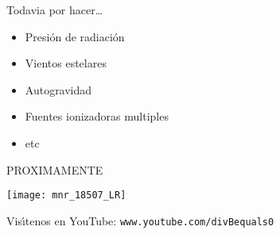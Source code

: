 \documentclass
[
]
{beamer}
\begin{document}
{\begin{frame}[plain]
\centerline{Todavia por hacer\dots}
\vfill
\begin{itemize}
\item Presi\'on de radiaci\'on
\vfill
\item Vientos estelares
\vfill
\item Autogravidad
\vfill
\item Fuentes ionizadoras multiples
\vfill
\item etc
\end{itemize}
\vfill
\end{frame}
\begin{frame}[plain]
\centerline{PROXIMAMENTE}
\vfill
\centerline{\texttt{[image: mnr\_18507\_LR]}}
\vfill
\centerline{Vis\'{\i}tenos en YouTube: \texttt{www.youtube.com/divBequals0}}
\vfill
\end{frame}
}
\end{document}
